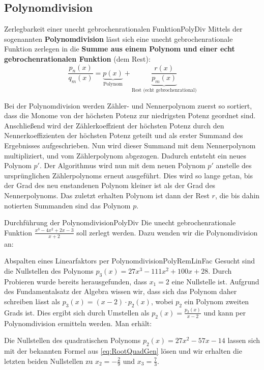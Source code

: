 \subsection{Polynomdivision}

\begin{statement}{Zerlegbarkeit einer unecht gebrochenrationalen Funktion}{PolyDiv}
    Mittels der sogenannten \textbf{Polynomdivision} lässt sich eine unecht gebrochenrationale Funktion zerlegen in die \textbf{Summe aus einem Polynom und einer echt gebrochenrationalen Funktion} (dem Rest):
    $$
        \frac{p_n(x)}{q_m(x)} = \underbrace{p(x)}_{\text{Polynom}} + \underbrace{\frac{r(x)}{p_m(x)}}_{\text{Rest (echt gebrochenrational)}}
    $$
\end{statement}

Bei der Polynomdivision werden Zähler- und Nennerpolynom zuerst so sortiert, dass die Monome von der höchsten Potenz zur niedrigsten Potenz geordnet sind. Anschließend wird der Zählerkoeffzient der höchsten Potenz durch den Nennerkoeffizienten der höchsten Potenz geteilt und als erster Summand des Ergebnisses aufgeschrieben. Nun wird dieser Summand mit dem Nennerpolynom multipliziert, und vom Zählerpolynom abgezogen. Dadurch entsteht ein neues Polynom $p'$. Der Algorithmus wird nun mit dem neuen Polynom $p'$ anstelle des ursprünglichen Zählerpolynoms erneut ausgeführt. Dies wird so lange getan, bis der Grad des neu enstandenen Polynom kleiner ist als der Grad des Nennerpolynoms. Das zuletzt erhalten Polynom ist dann der Rest $r$, die bis dahin notierten Summanden sind das Polynom $p$.

\begin{example}{Durchführung der Polynomdivision}{PolyDiv}
    Die unecht gebrochenrationale Funktion $\frac{x^3-4x^2+2x-3}{x+2}$ soll zerlegt werden. Dazu wenden wir die Polynomdivision an:

\end{example}

\begin{example}{Abspalten eines Linearfaktors per Polynomdivision}{PolyRemLinFac}
    Gesucht sind die Nullstellen des Polynoms $p_3(x) = 27x^3-111x^2+100x+28$. Durch Probieren wurde bereits herausgefunden, dass $x_1 =2$ eine Nullstelle ist. Aufgrund des Fundamentalsatz der Algebra wissen wir, dass sich das Polynom daher schreiben lässt als $p_3(x) = (x-2) \cdot p_2(x)$, wobei $p_2$ ein Polynom zweiten Grads ist. Dies ergibt sich durch Umstellen als $p_2(x) = \frac{p_3(x)}{x-2}$ und kann per Polynomdivision ermitteln werden. Man erhält:


    Die Nullstellen des quadratischen Polynoms $p_2(x) = 27x^2-57x-14$ lassen sich mit der bekannten Formel aus \ref{eq:RootQuadGen} lösen und wir erhalten die letzten beiden Nullstellen zu $x_2=-\frac{2}{9}$ und $x_3=\frac{7}{3}$.
\end{example}

